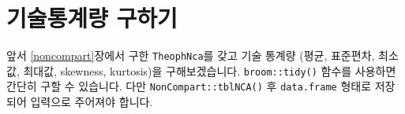 \documentclass[12pt,]{krantz}
\newenvironment{Shaded}{\begin{snugshade}}{\end{snugshade}}
\newcommand{\KeywordTok}[1]{\textcolor[rgb]{0.13,0.29,0.53}{\textbf{#1}}}
\newcommand{\DataTypeTok}[1]{\textcolor[rgb]{0.13,0.29,0.53}{#1}}
\newcommand{\DecValTok}[1]{\textcolor[rgb]{0.00,0.00,0.81}{#1}}
\newcommand{\StringTok}[1]{\textcolor[rgb]{0.31,0.60,0.02}{#1}}
\newcommand{\OtherTok}[1]{\textcolor[rgb]{0.56,0.35,0.01}{#1}}
\newcommand{\OperatorTok}[1]{\textcolor[rgb]{0.81,0.36,0.00}{\textbf{#1}}}
\newcommand{\NormalTok}[1]{#1}
\theoremstyle{definition}
\theoremstyle{definition}
\theoremstyle{definition}
\theoremstyle{remark}
\begin{document}
\section{기술통계량 구하기}\label{-}

앞서 \ref{noncompart}장에서 구한 \texttt{TheophNca}를 갖고 기술 통계량
(평균, 표준편차, 최소값, 최대값, skewness, kurtosis)을 구해보겠습니다.
\texttt{broom::tidy()} 함수를 사용하면 간단히 구할 수 있습니다. 다만
\texttt{NonCompart::tblNCA()} 후 \texttt{data.frame} 형태로 저장되어
입력으로 주어져야 합니다.

\begin{Shaded}
\end{Shaded}
\end{document}
